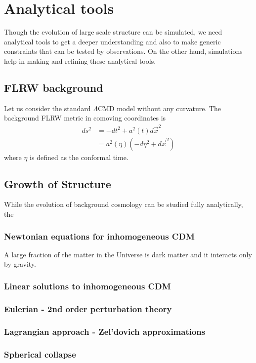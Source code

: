 \documentclass[12pt,twocolumn]{article}
\begin{document}
\section{Analytical tools}
Though the evolution of large scale structure can be simulated, we need analytical tools to get a deeper understanding and also to make generic constraints that can be tested by observations. On the other hand, simulations help in making and refining these analytical tools.\\

\subsection{FLRW background}
Let us consider the standard $\Lambda$CMD model without any curvature. The background FLRW metric in comoving coordinates is
\begin{align}
ds^2 &= -dt^2 + a^2(t) d\vec{x}^2\\
&= a^2(\eta) \left( -d\eta^2 + d\vec{x}^2 \right) 
\end{align}
where $\eta$ is defined as the conformal time.


\subsection{Growth of Structure}
While the evolution of background cosmology can be studied fully analytically, the
\subsubsection{Newtonian equations for inhomogeneous CDM}
A large fraction of the matter in the Universe is dark matter and it interacts only by gravity.

\subsubsection{Linear solutions to inhomogeneous CDM}

\subsubsection{Eulerian - 2nd order perturbation theory}

\subsubsection{Lagrangian approach - Zel'dovich approximations}

\subsubsection{Spherical collapse}
\end{document}
